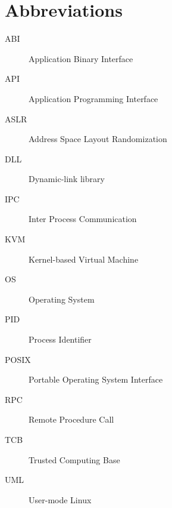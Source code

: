 \chapter*{Abbreviations}\label{abbr}
\begin{description}

\item[ABI] Application Binary Interface
\item[API] Application Programming Interface
\item[ASLR] Address Space Layout Randomization
\item[DLL] Dynamic-link library
\item[IPC] Inter Process Communication
\item[KVM] Kernel-based Virtual Machine
\item[OS] Operating System
\item[PID] Process Identifier
\item[POSIX] Portable Operating System Interface
\item[RPC] Remote Procedure Call
\item[TCB] Trusted Computing Base
\item[UML] User-mode Linux

\end{description}
